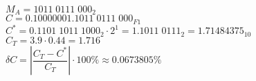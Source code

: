 \documentclass[12pt,a4paper]{report}
\begin{document}
    \hfill\break
    $M_A=1011\;0111\;000_2$\\
    $C=0.10000001.1011\;0111\;000_{F1}$\\
    $C^*=0.1101\;1011\;1000_2\cdot2^1=1.1011\;0111_2=1.71484375_{10}$\\
    $C_T=3.9\cdot0.44=1.716$\\
    $\delta C=|\dfrac{C_T-C^*}{C_T}|\cdot100\%\approx0.0673805\%$\\
\end{document}
